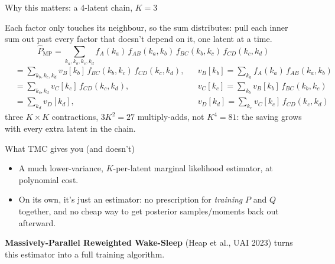 \documentclass[aspectratio=169]{beamer}
\begin{document}
\begin{frame}{Why this matters: a 4-latent chain, $K=3$}
  \begin{center}
  \end{center}
  \small
  Each factor only touches its neighbour, so the sum \alert{distributes}: pull
  each inner sum out past every factor that doesn't depend on it, one latent
  at a time.
  \[
    \hat P_{\text{MP}} = \sum_{k_a,k_b,k_c,k_d} f_A(k_a)\, f_{AB}(k_a,k_b)\, f_{BC}(k_b,k_c)\, f_{CD}(k_c,k_d)
  \]
  \vspace{-2mm}
  \begin{align*}
    &= \sum_{k_b,k_c,k_d} v_B[k_b]\, f_{BC}(k_b,k_c)\, f_{CD}(k_c,k_d),
      &&v_B[k_b] = \sum_{k_a} f_A(k_a)\, f_{AB}(k_a,k_b) \\
    &= \sum_{k_c,k_d} v_C[k_c]\, f_{CD}(k_c,k_d),
      &&v_C[k_c] = \sum_{k_b} v_B[k_b]\, f_{BC}(k_b,k_c) \\
    &= \sum_{k_d} v_D[k_d],
      &&v_D[k_d] = \sum_{k_c} v_C[k_c]\, f_{CD}(k_c,k_d)
  \end{align*}
  \vspace{-2mm}
  \small three $K{\times}K$ contractions, $3K^2 = 27$ multiply-adds, not
  $K^4 = 81$: the saving grows with every extra latent in the chain.
\end{frame}

\begin{frame}{What TMC gives you (and doesn't)}
  \begin{itemize}
    \item[\alert{+}] A much lower-variance, $K$-per-latent marginal
      likelihood estimator, at polynomial cost.
    \item[\alert{--}] On its own, it's just an estimator: no prescription
      for \emph{training} $P$ and $Q$ together, and no cheap way to get
      posterior samples/moments back out afterward.
  \end{itemize}
  \vfill
  \textbf{Massively-Parallel Reweighted Wake-Sleep} (Heap et al., UAI 2023)
  turns this estimator into a full training algorithm.
\end{frame}
\end{document}
